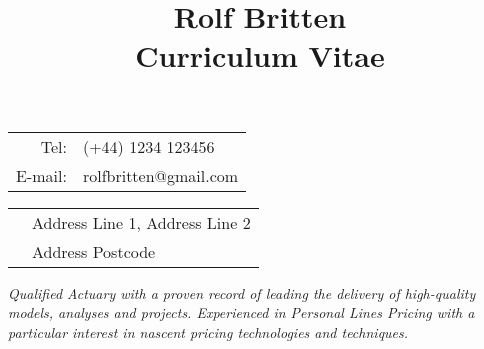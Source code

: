 \documentclass[11pt]{article}
\title{\bfseries \Huge Rolf Britten \\ \Large Curriculum Vitae}
\date{}
\begin{document}
\vspace{-20mm}
\maketitle
\vspace{-20mm}
\begin{minipage}[ht]{0.48\textwidth}
\begin{tabular}{r l}
Tel: & (+44) 1234 123456\\
E-mail: & rolfbritten@gmail.com\\
\end{tabular}
\end{minipage}
\begin{minipage}[ht]{0.48\textwidth}
\begin{tabular}{l l}
& Address Line 1, Address Line 2\\
& Address Postcode\
\end{tabular}
\end{minipage}

\begin{center} \emph{ Qualified Actuary with a proven record of leading the delivery of high-quality models, analyses and projects. Experienced in Personal Lines Pricing with a particular interest in nascent pricing technologies and techniques.} \end{center}
\end{document}

